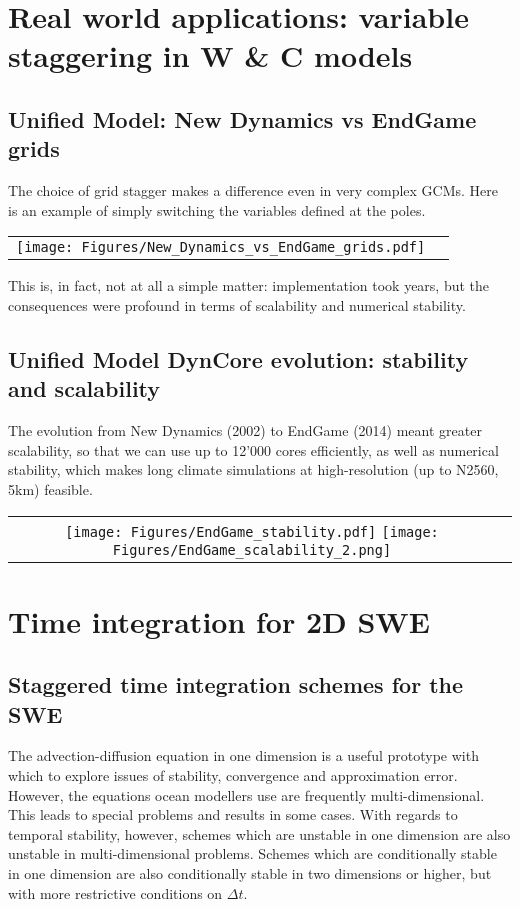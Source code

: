 \section{Real world applications: variable staggering in W \& C models}
\subsection{Unified Model: New Dynamics vs EndGame grids} 

The choice of grid stagger makes a difference even in very complex GCMs. Here is an example of simply switching the variables defined at the poles.

	\begin{tabular}{cc}
			\centering
			\texttt{[image: Figures/New\_Dynamics\_vs\_EndGame\_grids.pdf]}
		\end{tabular}

This is, in fact, not at all a simple matter: implementation took years, but the consequences were profound in terms of scalability and numerical stability.

\subsection{Unified Model DynCore evolution: stability and scalability} 
	
	The evolution from New Dynamics (2002) to EndGame (2014) meant greater scalability, so that we can use up to 12'000 cores efficiently, as well as numerical stability, which makes long climate simulations at high-resolution (up to N2560, 5km) feasible.
	
			\begin{tabular}{cc}
					\centering
					\texttt{[image: Figures/EndGame\_stability.pdf]}
					\texttt{[image: Figures/EndGame\_scalability\_2.png]}
				\end{tabular}
				
				

\section{Time integration for 2D SWE}
\subsection{Staggered time integration schemes for the SWE}

The advection-diffusion equation in one dimension is a useful prototype with which to explore issues of stability, convergence and approximation error. However, the equations ocean modellers use are frequently multi-dimensional. This leads to special problems and results in some cases. With regards to temporal stability, however, schemes which are unstable in one dimension are also unstable in multi-dimensional problems. Schemes which are conditionally stable in one dimension are also conditionally stable in two dimensions or higher, but with more restrictive conditions on $\Delta t$.

